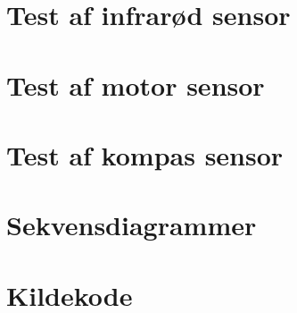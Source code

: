 \chapter{Test af infrarød sensor}

\chapter{Test af motor sensor}

\chapter{Test af kompas sensor}

\chapter{Sekvensdiagrammer}

\chapter{Kildekode}





